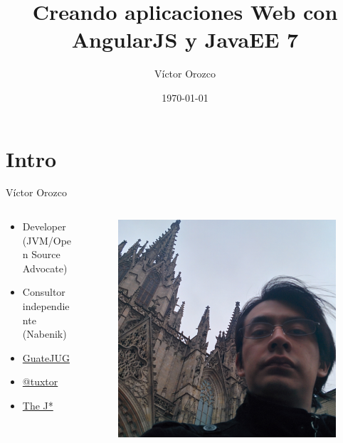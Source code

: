 \documentclass{beamer}
\title{Creando aplicaciones Web con AngularJS y JavaEE 7}
\author{Víctor Orozco}
\institute{Nabenik}
\date{\today}
\begin{document}
\frame{\titlepage}

\section{Intro}

\begin{frame}{Víctor Orozco}
     \begin{columns}[T] %
	     \begin{column}[T]{5cm} %
				\begin{itemize}
				\item Developer (JVM/Open Source Advocate)
				\item Consultor independiente (Nabenik)
				\item \href{https://twitter.com/tuxtor}{GuateJUG}
				\item \href{https://twitter.com/tuxtor}{@tuxtor}
				\item \href{http://vorozco.com}{The J*} 
				\end{itemize}
	     \end{column}
	     \begin{column}[T]{5cm} %
			\begin{figure}
			\centering
			\includegraphics[width=0.7\linewidth]{Images/barcelona.jpg}
			\end{figure}

	     \end{column}
     \end{columns}
\end{frame}
\end{document}

